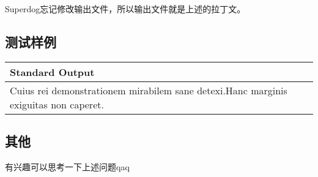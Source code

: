 Superdog忘记修改输出文件，所以输出文件就是上述的拉丁文。

\subsection*{测试样例}

\begin{table}[H]
    \begin{tabularx}{\textwidth}{|X|X|}
        \hline
        \textbf{Standard Output} \\
        \hline
         Cuius rei demonstrationem mirabilem sane detexi.Hanc marginis exiguitas non caperet. \\
        \hline
    \end{tabularx}
\end{table}

\subsection*{其他}
有兴趣可以思考一下上述问题qaq~
